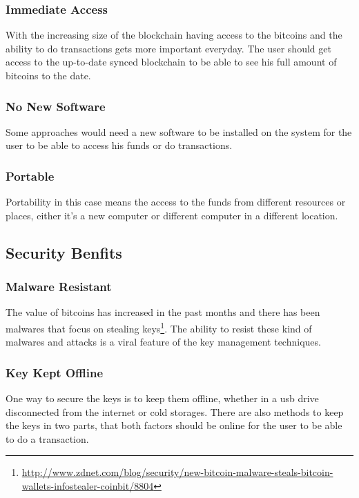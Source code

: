 \subsubsection{Immediate Access}
\label{Immediate Access}
With the increasing size of the blockchain having access to the bitcoins and the ability to do transactions gets more important everyday. The user should get access to the up-to-date synced blockchain to be able to see his full amount of bitcoins to the date.

\subsubsection{No New Software}  %
\label{No New Software}
Some approaches would need a new software to be installed on the system for the user to be able to access his funds or do transactions.

\subsubsection{Portable}
\label{Portable}
Portability in this case means the access to the funds from different resources or places, either it's a new computer or different computer in a different location.



\subsection{Security Benfits}

\subsubsection{Malware Resistant}
\label{Malware Resistant}
The value of bitcoins has increased in the past months and there has been malwares that focus on stealing keys\footnote{\url{http://www.zdnet.com/blog/security/new-bitcoin-malware-steals-bitcoin-wallets-infostealer-coinbit/8804}}. The ability to resist these kind of malwares and attacks is a viral feature of the key management techniques.

\subsubsection{Key Kept Offline}  %
\label{Key Kept Offline}
One way to secure the keys is to keep them offline, whether in a usb drive disconnected from the internet or cold storages. There are also methods to keep the keys in two parts, that both factors should be online for the user to be able to do a transaction.

